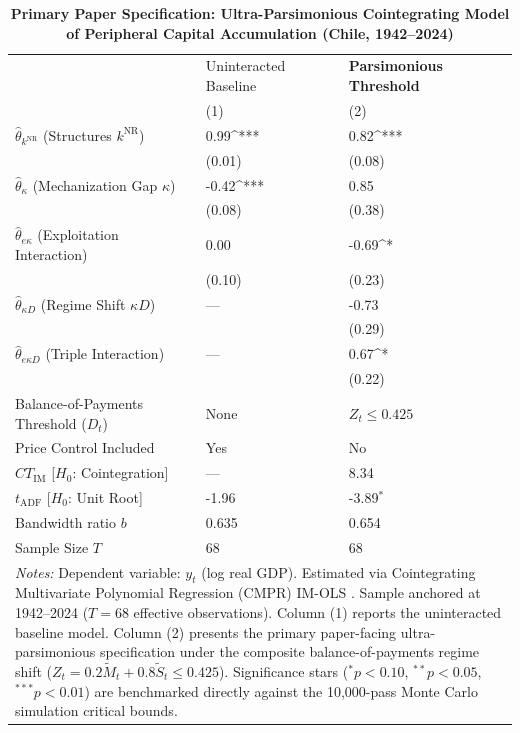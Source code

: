 \begin{table}[h!]
	\centering
	\caption{\textbf{Primary Paper Specification: Ultra-Parsimonious Cointegrating Model of Peripheral Capital Accumulation (Chile, 1942--2024)}}
	\label{tab:chile_parsimonious_champion}
	\small
	\begin{tabular}{p{5.5cm}p{3.2cm}p{3.2cm}}
		\toprule
		& Uninteracted Baseline & \textbf{Parsimonious Threshold} \\
		& (1) & (2) \\
		\midrule
		$\hat{\theta}_{k^{\text{NR}}}$ (Structures $k^{\text{NR}}$) & 0.99^{***} & 0.82^{***} \\
		& (0.01) & (0.08) \\
		$\hat{\theta}_{\kappa}$ (Mechanization Gap $\kappa$) & -0.42^{***} & 0.85 \\
		& (0.08) & (0.38) \\
		$\hat{\theta}_{e\kappa}$ (Exploitation Interaction) & 0.00 & -0.69^{*} \\
		& (0.10) & (0.23) \\
		$\hat{\theta}_{\kappa D}$ (Regime Shift $\kappa D$) & — & -0.73 \\
		& & (0.29) \\
		$\hat{\theta}_{e\kappa D}$ (Triple Interaction) & — & 0.67^{*} \\
		& & (0.22) \\
		\midrule
		Balance-of-Payments Threshold ($D_t$) & None & $Z_t \le 0.425$ \\
		Price Control Included & Yes & No \\
		$CT_{\text{IM}}$ [$H_0$: Cointegration] & — & 8.34 \\
		$t_{\text{ADF}}$ [$H_0$: Unit Root] & -1.96 & -3.89$^{*}$ \\
		Bandwidth ratio $b$ & 0.635 & 0.654 \\
		Sample Size $T$ & 68 & 68 \\
		\bottomrule
		\multicolumn{3}{p{12.4cm}}{\footnotesize \textit{Notes:} Dependent variable: $y_t$ (log real GDP). Estimated via Cointegrating Multivariate Polynomial Regression (CMPR) IM-OLS \citep{VogelsangWagner2024}. Sample anchored at 1942--2024 ($T=68$ effective observations). Column (1) reports the uninteracted baseline model. Column (2) presents the primary paper-facing ultra-parsimonious specification under the composite balance-of-payments regime shift ($Z_t = 0.2 \tilde{M}_t + 0.8 \tilde{S}_t \le 0.425$). Significance stars ($^*p<0.10$, $^{**}p<0.05$, $^{***}p<0.01$) are benchmarked directly against the 10,000-pass Monte Carlo simulation critical bounds.} \\
	\end{tabular}
\end{table}